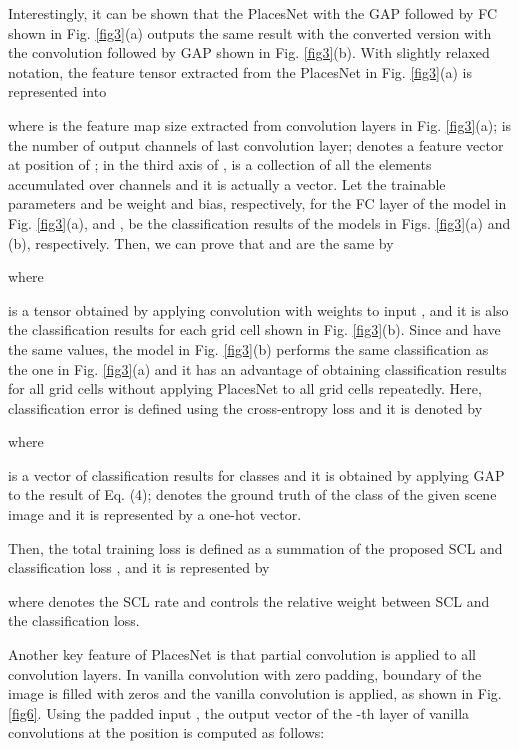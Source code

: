\documentclass[journal,comsoc]{IEEEtran}
\begin{document}
Interestingly, it can be shown that the PlacesNet with the GAP followed by FC shown in Fig. \ref{fig3}(a) outputs the same result with the converted version with the  convolution followed by GAP shown in Fig. \ref{fig3}(b). With slightly relaxed notation, the feature tensor extracted from the PlacesNet in Fig. \ref{fig3}(a) is represented into

where  is the feature map size extracted from convolution layers in Fig. \ref{fig3}(a);  is the number of output channels of last convolution layer;  denotes a feature vector at position  of ;  in the third axis of ,   is a collection of all the elements accumulated over  channels and it is actually a vector. Let the trainable parameters  and  be weight and bias, respectively, for the FC layer of the model in Fig. \ref{fig3}(a), and ,  be the classification results of the models in Figs. \ref{fig3}(a) and (b), respectively. Then, we can prove that  and  are the same by

where

is a tensor obtained by applying  convolution with weights  to input , and it is also the classification results for each grid cell shown in Fig. \ref{fig3}(b). Since  and  have the same values, the model in Fig. \ref{fig3}(b) performs the same classification as the one in Fig. \ref{fig3}(a) and it has an advantage of obtaining classification results  for all grid cells without applying PlacesNet to all grid cells repeatedly. Here, classification error is defined using the cross-entropy loss and it is denoted by 

where

is a vector of classification results for  classes and it is obtained by applying GAP to the result of Eq. (4);  denotes the ground truth of the class of the given scene image and it is represented by a one-hot vector.

Then, the total training loss  is defined as a summation of the proposed SCL  and classification loss , and it is represented by

where  denotes the SCL rate and controls the relative weight between SCL and the classification loss.

Another key feature of PlacesNet is that partial convolution \cite{b24} is applied to all convolution layers. In vanilla convolution with zero padding, boundary of the image is filled with zeros and the vanilla convolution is applied, as shown in Fig. \ref{fig6}. Using the padded input , the output vector  of the -th layer of vanilla convolutions at the position  is computed as follows: 
\end{document}
